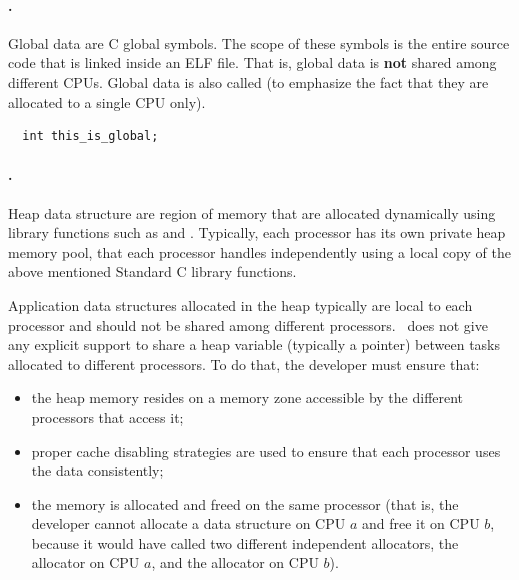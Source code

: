 \paragraph{.}

Global data are C global symbols. The scope of these symbols is the
entire source code that is linked inside an ELF file. That is, global
data is {\bf not} shared among different CPUs. Global data is also
called {\em {}} (to emphasize the fact that they are
allocated to a single CPU only).

\begin{lstlisting}
  int this_is_global;
\end{lstlisting}

\paragraph{.}

Heap data structure are region of memory that are allocated
dynamically using library functions such as  and
.  Typically, each processor has its own private heap
memory pool, that each processor handles independently using a local
copy of the above mentioned Standard C library functions.

Application data structures allocated in the heap typically are local
to each processor and should not be shared among different processors.
\ee\ does not give any explicit support to share a heap variable
(typically a pointer) between tasks allocated to different
processors. To do that, the developer must ensure that:
\begin{itemize}

\item the heap memory resides on a memory zone accessible by the
  different processors that access it;

\item proper cache disabling strategies are used to ensure that each
  processor uses the data consistently;

\item the memory is allocated and freed on the same processor (that
is, the developer cannot allocate a data structure on CPU $a$ and free
it on CPU $b$, because it would have called two different independent
allocators, the allocator on CPU $a$, and the allocator on CPU $b$).


\end{itemize}

